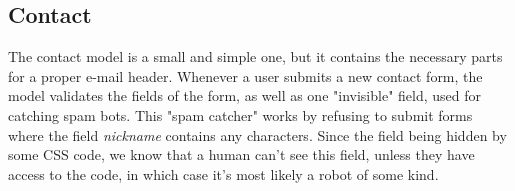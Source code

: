 \subsection{Contact}
\vspace{-5mm}
The contact model is a small and simple one, but it contains the necessary parts for a proper e-mail header. 
Whenever a user submits a new contact form, the model validates the fields of the form, as well as one "invisible" field, 
used for catching spam bots. This "spam catcher" works by refusing to submit forms where the field \textit{nickname} 
contains any characters. Since the field being hidden by some CSS code, we know that a human can't see this field, unless they have access to the code, in which case it's most likely a robot of some kind.
 

